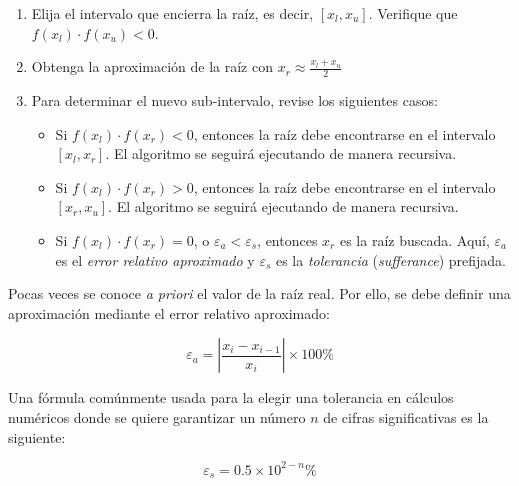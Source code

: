 \begin{enumerate}
    
    \item Elija el intervalo que encierra la raíz, es decir, $[x_l, x_u]$.
        Verifique que $f(x_l) \cdot f(x_u) < 0$.

    \item Obtenga la aproximación de la raíz con $x_r \approx \frac{x_l +
        x_u}{2}$

    \item Para determinar el nuevo sub-intervalo, revise los siguientes casos:
        \begin{itemize}
            \item Si $f(x_l) \cdot f(x_r) < 0$, entonces la raíz debe
                encontrarse en el intervalo $[x_l, x_r]$. El algoritmo se
                seguirá ejecutando de manera recursiva.

            \item Si $f(x_l) \cdot f(x_r) > 0$, entonces la raíz debe
                encontrarse en el intervalo $[x_r, x_u]$. El algoritmo se
                seguirá ejecutando de manera recursiva.

            \item Si $f(x_l) \cdot f(x_r) = 0$, o \(\varepsilon_a <
                \varepsilon_s\), entonces $x_r$ es la raíz buscada. Aquí,
                $\varepsilon_a$ es el \emph{error relativo aproximado} y
                $\varepsilon_s$ es la \emph{tolerancia} (\textit{sufferance})
                prefijada.

        \end{itemize}
\end{enumerate}

Pocas veces se conoce \textit{a priori} el valor de la raíz real. Por ello, se
debe definir una aproximación mediante el error relativo aproximado:

\[
    \varepsilon_a = \left| \frac{x_i - x_{i-1}}{x_i} \right| \times 100\%
\]

Una fórmula comúnmente usada para la elegir una tolerancia en cálculos numéricos
donde se quiere garantizar un número $n$ de cifras significativas es la
siguiente:

\[
    \varepsilon_s = 0.5 \times 10^{2-n} \%
\]

